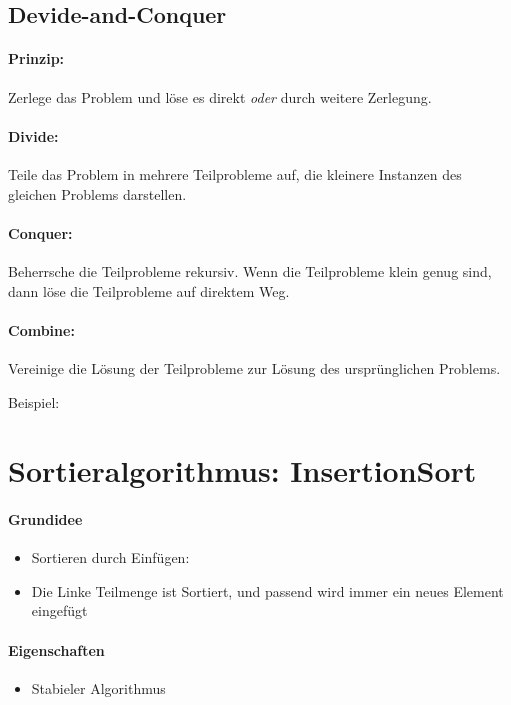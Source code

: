 	\subsection{Devide-and-Conquer}
	\paragraph{Prinzip:} Zerlege das Problem und löse es direkt \textit{oder} durch weitere Zerlegung.
	\paragraph{Divide:} Teile das Problem in mehrere Teilprobleme auf, die kleinere Instanzen des gleichen Problems darstellen.
	\paragraph{Conquer:} Beherrsche die Teilprobleme rekursiv. Wenn die Teilprobleme klein genug sind, dann löse die Teilprobleme auf direktem Weg.
	\paragraph{Combine:} Vereinige die Lösung der Teilprobleme zur Lösung des ursprünglichen Problems.

	\begin{center}
		Beispiel: \underline{}
	\end{center}


\vspace{1.5cm}
\section{Sortieralgorithmus: InsertionSort} %


\paragraph{Grundidee}
	\begin{itemize}
		\item Sortieren durch Einfügen:
		\item Die Linke Teilmenge ist Sortiert, und passend wird immer ein neues Element eingefügt 
	\end{itemize}

	\paragraph{Eigenschaften}
	\begin{itemize}
		\item Stabieler Algorithmus
	\end{itemize}

